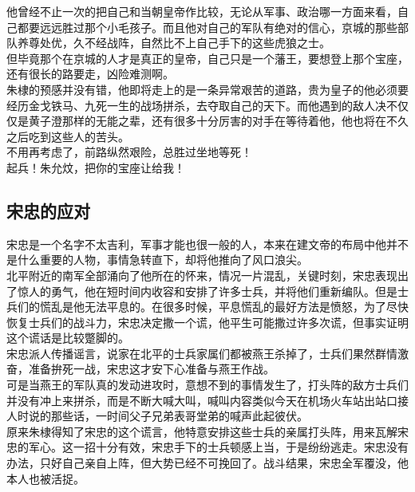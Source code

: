 \begin{multicols}{\theparacolNo}
他曾经不止一次的把自己和当朝皇帝作比较，无论从军事、政治哪一方面来看，自己都要远远胜过那个小毛孩子。而且他对自己的军队有绝对的信心，京城的那些部队养尊处优，久不经战阵，自然比不上自己手下的这些虎狼之士。\\

但毕竟那个在京城的人才是真正的皇帝，自己只是一个藩王，要想登上那个宝座，还有很长的路要走，凶险难测啊。\\

朱棣的预感并没有错，他即将走上的是一条异常艰苦的道路，贵为皇子的他必须要经历金戈铁马、九死一生的战场拼杀，去夺取自己的天下。而他遇到的敌人决不仅仅是黄子澄那样的无能之辈，还有很多十分厉害的对手在等待着他，他也将在不久之后吃到这些人的苦头。\\

不用再考虑了，前路纵然艰险，总胜过坐地等死！\\

起兵！朱允炆，把你的宝座让给我！\\

\subsection{宋忠的应对}
宋忠是一个名字不太吉利，军事才能也很一般的人，本来在建文帝的布局中他并不是什么重要的人物，事情急转直下，却将他推向了风口浪尖。\\

北平附近的南军全部涌向了他所在的怀来，情况一片混乱，关键时刻，宋忠表现出了惊人的勇气，他在短时间内收容和安排了许多士兵，并将他们重新编队。但是士兵们的慌乱是他无法平息的。在很多时候，平息慌乱的最好方法是愤怒，为了尽快恢复士兵们的战斗力，宋忠决定撒一个谎，他平生可能撒过许多次谎，但事实证明这个谎话是比较蹩脚的。\\

宋忠派人传播谣言，说家在北平的士兵家属们都被燕王杀掉了，士兵们果然群情激奋，准备拚死一战，宋忠这才安下心准备与燕王作战。\\

可是当燕王的军队真的发动进攻时，意想不到的事情发生了，打头阵的敌方士兵们并没有冲上来拼杀，而是不断大喊大叫，喊叫内容类似今天在机场火车站出站口接人时说的那些话，一时间父子兄弟表哥堂弟的喊声此起彼伏。\\

原来朱棣得知了宋忠的这个谎言，他特意安排这些士兵的亲属打头阵，用来瓦解宋忠的军心。这一招十分有效，宋忠手下的士兵顿感上当，于是纷纷逃走。宋忠没有办法，只好自己亲自上阵，但大势已经不可挽回了。战斗结果，宋忠全军覆没，他本人也被活捉。\\


\end{multicols}
